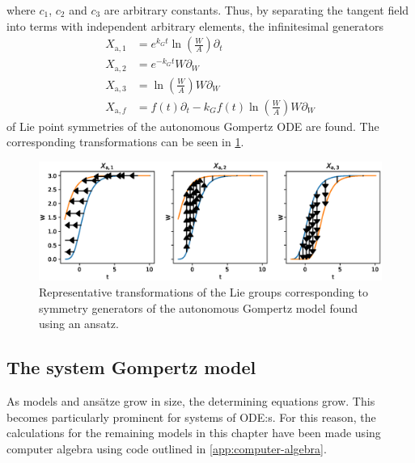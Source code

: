 where \(c_1\), \(c_2\) and \(c_3\) are arbitrary constants.
Thus, by separating the tangent field into terms with independent arbitrary elements, the infinitesimal generators
\begin{align*}
  X_{\text{a},1} &= e^{k_G t} \ln\left(\frac{W}{A}\right) \partial_t \\
  X_{\text{a},2} &= e^{-k_G t} W \partial_W \\
  X_{\text{a},3} &= \ln\left(\frac{W}{A}\right) W \partial_W \\
  X_{\text{a},f} &= f(t) \partial_t - k_G f(t) \ln\left(\frac{W}{A}\right) W \partial_W
\end{align*}
of Lie point symmetries of the autonomous Gompertz ODE  are found.
The corresponding transformations can be seen in \cref{fig:gompertz-autonomous-ansatz}.
\begin{figure}
  \centering
  \includegraphics[width=.96\textwidth]{images/gompertz-autonomous-ansatz}
  \caption{Representative transformations of the Lie groups corresponding to symmetry generators of the autonomous Gompertz model found using an ansatz.}
  \label{fig:gompertz-autonomous-ansatz}
\end{figure}

\subsection{The system Gompertz model}

As models and ansätze grow in size, the determining equations grow.
This becomes particularly prominent for systems of ODE:s.
For this reason, the calculations for the remaining models in this chapter have been made using computer algebra using code outlined in \cref{app:computer-algebra}.

